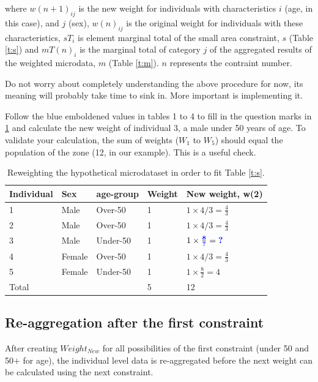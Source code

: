 \documentclass[a4paper, 11pt, twoside]{article}
\begin{document}
where $w(n+1)_{ij}$ is the new weight for individuals with characteristics $i$
(age, in this case), and $j$ (sex),  $w(n)_{ij}$ is the original
weight for individuals with these characteristics, $sT_{i}$ is element
marginal total of the small area constraint, $s$
(Table \ref{t:s}) and $mT(n)_{i}$ is the marginal total of category
$j$ of the aggregated results of the weighted
microdata, $m$ (Table \ref{t:m}).
$n$ represents the contraint number.

Do not worry about completely understanding the above procedure for now, its
meaning will probably take time to sink in.
More important is implementing it.

Follow the blue emboldened values in tables 1 to 4 to fill in the
question marks in \cref{t:new-weights} and calculate the new weight
of individual 3, a male under 50 years of age.
To validate your calculation, the sum of weights ($W_1$ to $W_5$)
should equal the population of the zone (12, in our example). This is a
useful check.

\begin{table}[htbp]
\centering
\caption{Reweighting the hypothetical microdataset in order to fit
Table \ref{t:s}.}
\begin{tabular}{lllll}
\toprule
{Individual} & {Sex} & {age-group} & {Weight} &
{New weight, w(2)} \\ \midrule
1 & Male & Over-50 & 1 & $1 \times 4/3 = \frac{4}{3}$ \\
2 & Male & Over-50 & 1 & $1 \times 4/3 = \frac{4}{3}$ \\
3 & Male & Under-50 & 1 & $1 \times \frac{\textbf{\color{blue}8}}{\textbf{\color{blue}?}} = \textbf{\color{blue}?}$ \\
4 & Female & Over-50 & 1 & $1 \times 4/3 = \frac{4}{3}$ \\
5 & Female & Under-50 & 1 & $1 \times \frac{8}{2} = 4$ \\
\midrule
Total & & & 5 & 12 \\
\bottomrule
\end{tabular}
\label{t:new-weights}
\end{table}

\subsection{Re-aggregation after the first constraint} \label{sreag}
After creating $Weight_{New}$ for all possibilities of the first constraint (under 50 and 50$+$ for age),
the individual level data is re-aggregated before the next weight can be calculated using the next constraint.
\end{document}
